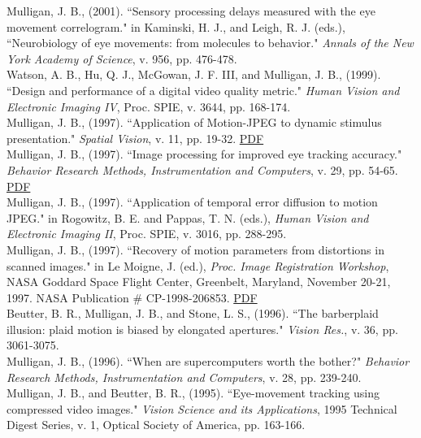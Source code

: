 \documentclass[12pt]{article}
\newcommand{\years}[1]{\marginnote{\scriptsize #1}}
\begin{document}
\years{2001}
Mulligan, J. B., (2001).
``Sensory processing delays measured with the eye movement correlogram."
in Kaminski, H. J., and Leigh, R. J. (eds.),
``Neurobiology of eye movements:  from molecules to behavior."
\emph{Annals of the New York Academy of Science}, v. 956, pp. 476-478.\\

\years{1999}
Watson, A. B., Hu, Q. J., McGowan, J. F. III, and Mulligan, J. B., (1999).
``Design and performance of a digital video quality metric."
\emph{Human Vision and Electronic Imaging IV}, 
Proc. SPIE, v. 3644,
pp. 168-174.\\

\years{1997}
Mulligan, J. B., (1997).
``Application of Motion-JPEG to dynamic stimulus presentation."
\emph{Spatial Vision}, v. 11, pp. 19-32.  \href{http://scanpath.arc.nasa.gov/pub_files/mjpeg.pdf}{PDF}\\

Mulligan, J. B., (1997).
``Image processing for improved eye tracking accuracy."
\emph{Behavior Research Methods, Instrumentation and Computers},
v. 29, pp. 54-65.  \href{http://scanpath.arc.nasa.gov/pub_files/mulligan_brmic97.pdf}{PDF}\\

Mulligan, J. B., (1997).
``Application of temporal error diffusion to motion JPEG."
in Rogowitz, B. E. and Pappas, T. N. (eds.),
\emph{Human Vision and Electronic Imaging II},
Proc. SPIE, v. 3016,
pp. 288-295.\\

Mulligan, J. B., (1997).
``Recovery of motion parameters from distortions in scanned images."
in Le Moigne, J. (ed.),
\emph{Proc. Image Registration Workshop},
NASA Goddard Space Flight Center, Greenbelt, Maryland, November 20-21, 1997.
NASA Publication \# CP-1998-206853.  \href{http://scanpath.arc.nasa.gov/pub_files/irw97.pdf}{PDF}\\

\years{1996}
Beutter, B. R., Mulligan, J. B., and Stone, L. S., (1996).
``The barberplaid illusion:  plaid motion is biased by elongated apertures."
\emph{Vision Res.}, v. 36, pp. 3061-3075.\\

Mulligan, J. B., (1996).
``When are supercomputers worth the bother?"
\emph{Behavior Research Methods, Instrumentation and Computers},
v. 28, pp. 239-240.\\

\years{1995}
Mulligan, J. B., and Beutter, B. R., (1995).
``Eye-movement tracking using compressed video images."
\emph{Vision Science and its Applications},
1995 Technical Digest Series,
v. 1,
Optical Society of America,
pp. 163-166.\\
\end{document}
